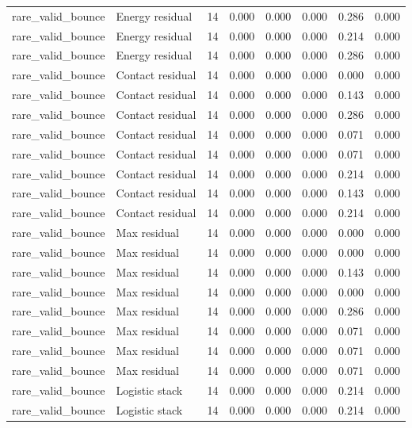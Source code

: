 {\begin{longtable}{llrrrrrr}
rare\_valid\_bounce & Energy residual & 14 & 0.000 & 0.000 & 0.000 & 0.286 & 0.000 \\
rare\_valid\_bounce & Energy residual & 14 & 0.000 & 0.000 & 0.000 & 0.214 & 0.000 \\
rare\_valid\_bounce & Energy residual & 14 & 0.000 & 0.000 & 0.000 & 0.286 & 0.000 \\
rare\_valid\_bounce & Contact residual & 14 & 0.000 & 0.000 & 0.000 & 0.000 & 0.000 \\
rare\_valid\_bounce & Contact residual & 14 & 0.000 & 0.000 & 0.000 & 0.143 & 0.000 \\
rare\_valid\_bounce & Contact residual & 14 & 0.000 & 0.000 & 0.000 & 0.286 & 0.000 \\
rare\_valid\_bounce & Contact residual & 14 & 0.000 & 0.000 & 0.000 & 0.071 & 0.000 \\
rare\_valid\_bounce & Contact residual & 14 & 0.000 & 0.000 & 0.000 & 0.071 & 0.000 \\
rare\_valid\_bounce & Contact residual & 14 & 0.000 & 0.000 & 0.000 & 0.214 & 0.000 \\
rare\_valid\_bounce & Contact residual & 14 & 0.000 & 0.000 & 0.000 & 0.143 & 0.000 \\
rare\_valid\_bounce & Contact residual & 14 & 0.000 & 0.000 & 0.000 & 0.214 & 0.000 \\
rare\_valid\_bounce & Max residual & 14 & 0.000 & 0.000 & 0.000 & 0.000 & 0.000 \\
rare\_valid\_bounce & Max residual & 14 & 0.000 & 0.000 & 0.000 & 0.000 & 0.000 \\
rare\_valid\_bounce & Max residual & 14 & 0.000 & 0.000 & 0.000 & 0.143 & 0.000 \\
rare\_valid\_bounce & Max residual & 14 & 0.000 & 0.000 & 0.000 & 0.000 & 0.000 \\
rare\_valid\_bounce & Max residual & 14 & 0.000 & 0.000 & 0.000 & 0.286 & 0.000 \\
rare\_valid\_bounce & Max residual & 14 & 0.000 & 0.000 & 0.000 & 0.071 & 0.000 \\
rare\_valid\_bounce & Max residual & 14 & 0.000 & 0.000 & 0.000 & 0.071 & 0.000 \\
rare\_valid\_bounce & Max residual & 14 & 0.000 & 0.000 & 0.000 & 0.071 & 0.000 \\
rare\_valid\_bounce & Logistic stack & 14 & 0.000 & 0.000 & 0.000 & 0.214 & 0.000 \\
rare\_valid\_bounce & Logistic stack & 14 & 0.000 & 0.000 & 0.000 & 0.214 & 0.000 \\

\end{longtable}}
